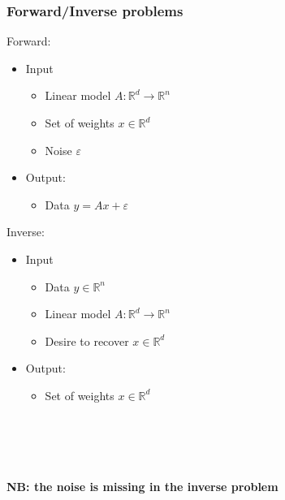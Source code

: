 \documentclass[aspectratio=169]{beamer}
\newcommand{\rd}{\mathbb{R}^d}
\newcommand{\rn}{\mathbb{R}^n}
\begin{document}
		\begin{frame}
		\frametitle{Forward/Inverse problems}
		\begin{center}
		\begin{minipage}{.45\textwidth}
		Forward:
		\begin{itemize}
		\item Input
		\begin{itemize}
		\item Linear model $A:\rd\to\rn$
		\item Set of weights $x\in\rd$
		\item Noise $\varepsilon$
		\end{itemize}
		\item Output:
		\begin{itemize}
		\item Data $y = Ax + \varepsilon$
		\end{itemize}
		\end{itemize}
		\end{minipage}
		\begin{minipage}{.45\textwidth}
		Inverse:
		\begin{itemize}
		\item Input
		\begin{itemize}
		\item Data $y\in\rn$
		\item Linear model $A:\rd\to\rn$
		\item Desire to recover $x\in \rd$
		\end{itemize}
		\item Output:
		\begin{itemize}
		\item Set of weights $x\in\rd$
		\end{itemize}
		\end{itemize}
		\end{minipage}
		\quad \\ \quad \\ \quad \\ \quad \\
		\pause
		\textbf{NB: the noise is missing in the inverse problem}
		
		\end{center}
		\end{frame}
		
\end{document}
